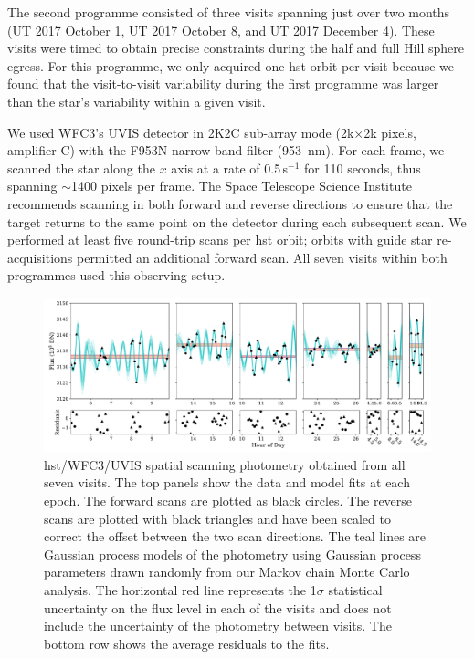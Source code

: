 \documentclass[longauth]{aa} %
\begin{document}
The second programme consisted of three visits spanning just over two months (UT 2017 October 1, UT 2017 October 8, and UT 2017 December 4).
%
These visits were timed to obtain precise constraints during the half and full Hill sphere egress.
%
For this programme, we only acquired one \ac{hst} orbit per visit because we found that the visit-to-visit variability during the first programme was larger than the star's variability within a given visit.

We used WFC3's UVIS detector in 2K2C sub-array mode (2k$\times$2k pixels, amplifier C) with the F953N narrow-band filter (953~nm).
%
For each frame, we scanned the star along the $x$ axis at a rate of 0.5\arcsec\,s$^{-1}$
for 110 seconds, thus spanning $\sim$1400 pixels per frame.
%
The Space Telescope Science Institute recommends scanning in both forward and reverse directions to ensure that the target returns to the same point on the detector during each subsequent scan.
%
We performed at least five round-trip scans per \ac{hst} orbit; orbits with guide star re-acquisitions permitted an additional forward scan.  All seven visits within both programmes used this observing setup.

\begin{figure}
\includegraphics[width=1.0\textwidth]{hst_visitall-gpfit-maternperiodic.pdf}
\caption{\ac{hst}/WFC3/UVIS spatial scanning photometry obtained from all seven visits. The top panels show the data and model fits at each epoch. The forward scans are plotted as black circles. The reverse scans are plotted with black triangles and have been scaled to correct the offset between the two scan directions. The teal lines are Gaussian process models of the photometry using Gaussian process parameters drawn randomly from our Markov chain Monte Carlo analysis. The horizontal red line represents the 1$\sigma$ statistical uncertainty on the flux level in each of the visits and does not include the uncertainty of the photometry between visits. The bottom row shows the average residuals to the fits.
\label{fig:visits}}
\end{figure}
\end{document}
